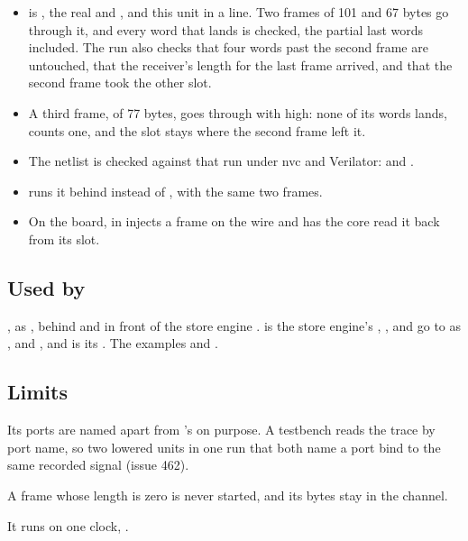 \begin{itemize}
\item {} is , the real  and
, and this unit in a line. Two frames of 101 and 67 bytes
go through it, and every word that lands is checked, the partial last
words included. The run also checks that four words past the second
frame are untouched, that the receiver's length for the last frame
arrived, and that the second frame took the other slot.
\item A third frame, of 77 bytes, goes through with 
high: none of its words lands,  counts one, and the slot
stays where the second frame left it.
\item The netlist is checked against that run under nvc and
Verilator: 
and .
\item {} runs it behind  instead of
, with the same two frames.
\item On the board,
in  injects a frame on the wire and
has the core read it back from its slot.
\end{itemize}

\subsection*{Used by}

, as , behind  and in front of the
store engine .  is the store engine's
, ,  and  go to
 as ,  and
, and  is its . The examples
 and .

\subsection*{Limits}

Its ports are named apart from 's on purpose. A
testbench reads the trace by port name, so two lowered units in one
run that both name a port  bind to the same recorded signal
(issue 462).

A frame whose length is zero is never started, and its bytes stay in
the channel.

It runs on one clock, .
